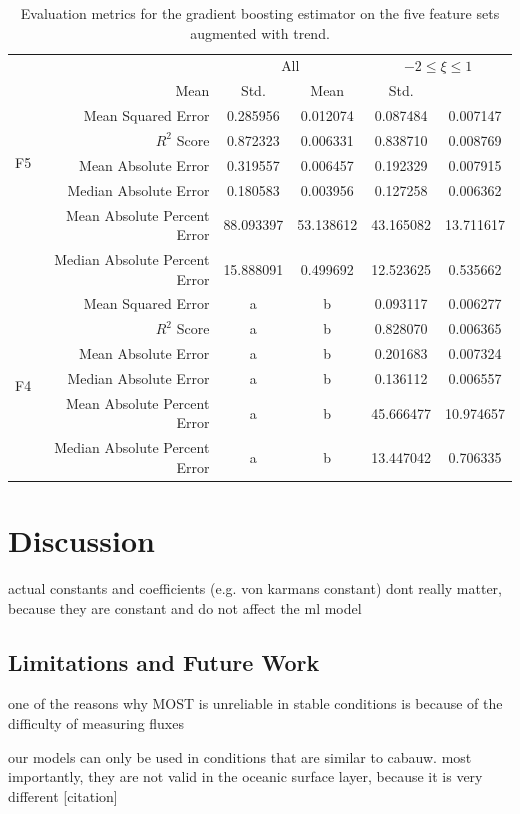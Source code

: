 \documentclass[12pt]{book}
\begin{document}
\begin{table}[]
\centering
\caption{Evaluation metrics for the gradient boosting estimator on the five feature sets augmented with trend.}
\label{tbl:gb_results_f5t}
\begin{tabular}{c|r|c|c|c|c}
& & \multicolumn{2}{c|}{All} & \multicolumn{2}{c}{$-2\le\xi\le1$} \\
\multirow{6}{*}{F5} & Mean & Std. & Mean & Std.   \\ \hline
& Mean Squared Error 					& 0.285956	& 0.012074 & 0.087484    & 0.007147    \\  
& $R^2$ Score									& 0.872323   & 0.006331   & 0.838710    & 0.008769    \\
& Mean Absolute Error 					& 0.319557   & 0.006457 & 0.192329    & 0.007915    \\
& Median Absolute Error 				& 0.180583  	& 0.003956   & 0.127258    & 0.006362   \\
& Mean Absolute Percent Error		& 88.093397	& 53.138612  & 43.165082   & 13.711617   \\
& Median Absolute Percent Error	& 15.888091	& 0.499692 & 12.523625    & 0.535662   \\ \hline
\multirow{6}{*}{F4} & Mean Squared Error 					& a & b & 0.093117   & 0.006277   \\ 
& $R^2$ Score									& a & b & 0.828070   & 0.006365   \\
& Mean Absolute Error 					& a & b & 0.201683      & 0.007324   \\
& Median Absolute Error 				& a & b & 0.136112   & 0.006557   \\
& Mean Absolute Percent Error  	& a & b & 45.666477  & 10.974657  \\
& Median Absolute Percent Error	& a & b & 13.447042   & 0.706335  \\ \hline
\end{tabular}
\end{table}




\chapter{Discussion}
actual constants and coefficients (e.g. von karmans constant) dont really matter, because they are constant and do not affect the ml model 

\section{Limitations and Future Work}
one of the reasons why MOST is unreliable in stable conditions is because of the difficulty of measuring fluxes

our models can only be used in conditions that are similar to cabauw. most importantly, they are not valid in the oceanic surface layer, because it is very different [citation]

%



\end{document}
